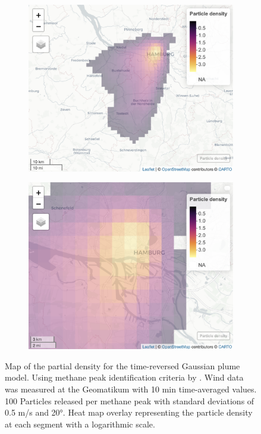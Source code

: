 \begin{figure}
\centering
\begin{subfigure}{.5\textwidth}
  \centering
  \includegraphics[width=1\linewidth]{figures/Appendix/Transportmodel/10_Emission_Distribution_with_Changing_Measured_Wind_paper_peaks.png}
  \caption{}
  \label{TransportmodelPaperPeaksLrage}
\end{subfigure}%
\begin{subfigure}{.5\textwidth}
  \centering
  \includegraphics[width=1\linewidth]{figures/Appendix/Transportmodel/10_Emission_Distribution_with_Changing_Measured_Wind_paper_peaks_Zoom.png}
  \caption{}
  \label{TransportmodelPaperPeaksZoom}
\end{subfigure}
\caption[Transport Model with literature Peak identification criteria]{Map of the partial density for the time-reversed Gaussian plume model. Using methane peak identification criteria by \cite{Menoud.2021}. Wind data was measured at the Geomatikum with 10 min time-averaged values. 100 Particles released per methane peak with standard deviations of 0.5 m/s and 20°. Heat map overlay representing the particle density at each segment  with a logarithmic scale.}
\label{TransportmodelPaperPeaks}
\end{figure}

